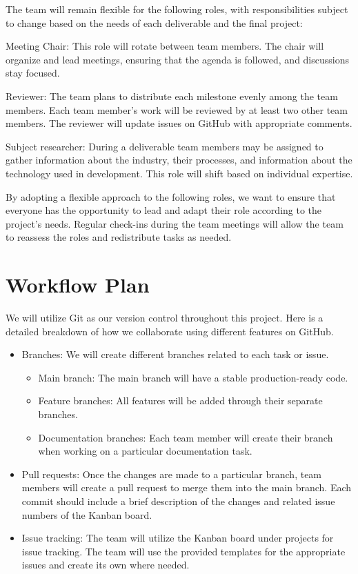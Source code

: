 \documentclass{article}
\begin{document}
The team will remain flexible for the following roles, with responsibilities subject to change based on the needs of each deliverable and the final project:

Meeting Chair: This role will rotate between team members. The chair will organize and lead meetings, ensuring that the agenda is followed, and discussions stay focused.

Reviewer: The team plans to distribute each milestone evenly among the team members. Each team member’s work will be reviewed by at least two other team members. The reviewer will update issues on GitHub with appropriate comments.

Subject researcher: During a deliverable team members may be assigned to gather information about the industry, their processes, and information about the technology used in development. This role will shift based on individual expertise.

By adopting a flexible approach to the following roles, we want to ensure that everyone has the opportunity to lead and adapt their role according to the project’s needs. Regular check-ins during the team meetings will allow the team to reassess the roles and redistribute tasks as needed. 


\section{Workflow Plan}

We will utilize Git as our version control throughout this project. Here is a detailed breakdown of how we collaborate using different features on GitHub. 

\begin{itemize}
\item Branches: We will create different branches related to each task or issue. 
\begin{itemize}
\item Main branch: The main branch will have a stable production-ready code. 
\item Feature branches: All features will be added through their separate branches.
\item Documentation branches: Each team member will create their branch when working on a particular documentation task. 
\end{itemize}

\item Pull requests: Once the changes are made to a particular branch, team members will create a pull request to merge them into the main branch. Each commit should include a brief description of the changes and related issue numbers of the Kanban board.

\item Issue tracking: The team will utilize the Kanban board under projects for issue tracking. The team will use the provided templates for the appropriate issues and create its own where needed. 
\end{itemize}
\end{document}

